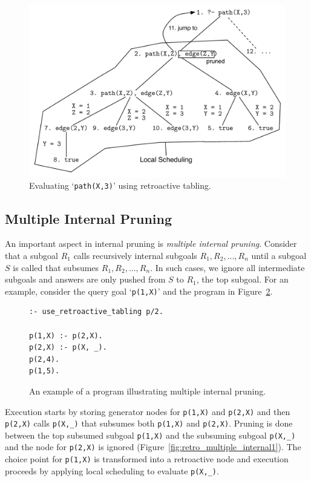 \begin{figure}[ht]
  \centering
    \includegraphics[scale=0.7]{retro_path.pdf}
  \caption{Evaluating `\texttt{path(X,3)}' using retroactive tabling.}
  \label{fig:retro_path}
\end{figure}

\subsection{Multiple Internal Pruning}

An important aspect in internal pruning is \textit{multiple internal pruning}.
Consider that a subgoal $R_1$ calls recursively internal subgoals $R_1, R_2, ..., R_n$ until a subgoal
$S$ is called that subsumes $R_1, R_2, ..., R_n$. In such cases, we ignore all intermediate subgoals
and answers are only pushed from $S$ to $R_1$, the top subgoal. 
For an example, consider the query goal `\texttt{p(1,X)}' and the program in Figure~\ref{fig:retro_multiple_internal_program}.

\begin{figure}[ht]
\begin{Verbatim}
:- use_retroactive_tabling p/2.

p(1,X) :- p(2,X).
p(2,X) :- p(X, _).
p(2,4).
p(1,5).
\end{Verbatim}
\caption{An example of a program illustrating multiple internal pruning.}
\label{fig:retro_multiple_internal_program}
\end{figure}

Execution starts by storing generator nodes for \texttt{p(1,X)} and \texttt{p(2,X)} and then
\texttt{p(2,X)} calls \texttt{p(X,\_)} that subsumes both \texttt{p(1,X)} and \texttt{p(2,X)}.
Pruning is done between the top subsumed subgoal \texttt{p(1,X)} and the subsuming subgoal
\texttt{p(X,\_)} and the node for \texttt{p(2,X)} is ignored (Figure~\ref{fig:retro_multiple_internal1}).
The choice point for \texttt{p(1,X)} is transformed into a retroactive node and execution proceeds by
applying local scheduling to evaluate \texttt{p(X,\_)}.


